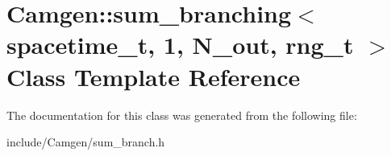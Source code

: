 \hypertarget{a00527}{}\section{Camgen\+:\+:sum\+\_\+branching$<$ spacetime\+\_\+t, 1, N\+\_\+out, rng\+\_\+t $>$ Class Template Reference}
\label{a00527}


The documentation for this class was generated from the following file\+:\begin{DoxyCompactItemize}
\item 
include/\+Camgen/sum\+\_\+branch.\+h\end{DoxyCompactItemize}
